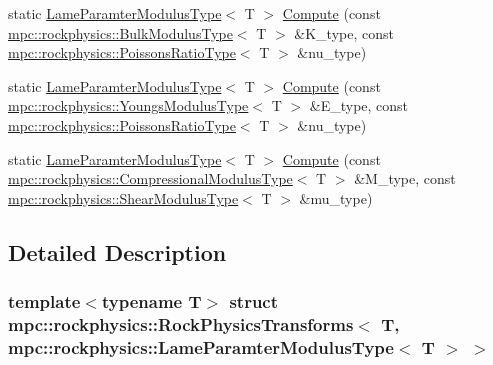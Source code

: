 \begin{DoxyCompactItemize}
\item 
static \mbox{\hyperlink{structmpc_1_1rockphysics_1_1_lame_paramter_modulus_type}{Lame\+Paramter\+Modulus\+Type}}$<$ T $>$ \mbox{\hyperlink{structmpc_1_1rockphysics_1_1_rock_physics_transforms_3_01_t_00_01mpc_1_1rockphysics_1_1_lame_para5e1496021e3962f82419b3f52eb8942_a8a33b7636abc317e5ff1d91dcbed6797}{Compute}} (const \mbox{\hyperlink{structmpc_1_1rockphysics_1_1_bulk_modulus_type}{mpc\+::rockphysics\+::\+Bulk\+Modulus\+Type}}$<$ T $>$ \&K\+\_\+type, const \mbox{\hyperlink{structmpc_1_1rockphysics_1_1_poissons_ratio_type}{mpc\+::rockphysics\+::\+Poissons\+Ratio\+Type}}$<$ T $>$ \&nu\+\_\+type)
\item 
static \mbox{\hyperlink{structmpc_1_1rockphysics_1_1_lame_paramter_modulus_type}{Lame\+Paramter\+Modulus\+Type}}$<$ T $>$ \mbox{\hyperlink{structmpc_1_1rockphysics_1_1_rock_physics_transforms_3_01_t_00_01mpc_1_1rockphysics_1_1_lame_para5e1496021e3962f82419b3f52eb8942_aff263f00bac2fc503336ebb19f160db4}{Compute}} (const \mbox{\hyperlink{structmpc_1_1rockphysics_1_1_youngs_modulus_type}{mpc\+::rockphysics\+::\+Youngs\+Modulus\+Type}}$<$ T $>$ \&E\+\_\+type, const \mbox{\hyperlink{structmpc_1_1rockphysics_1_1_poissons_ratio_type}{mpc\+::rockphysics\+::\+Poissons\+Ratio\+Type}}$<$ T $>$ \&nu\+\_\+type)
\item 
static \mbox{\hyperlink{structmpc_1_1rockphysics_1_1_lame_paramter_modulus_type}{Lame\+Paramter\+Modulus\+Type}}$<$ T $>$ \mbox{\hyperlink{structmpc_1_1rockphysics_1_1_rock_physics_transforms_3_01_t_00_01mpc_1_1rockphysics_1_1_lame_para5e1496021e3962f82419b3f52eb8942_afefb8b5bba91818370a629a0ff035c35}{Compute}} (const \mbox{\hyperlink{structmpc_1_1rockphysics_1_1_compressional_modulus_type}{mpc\+::rockphysics\+::\+Compressional\+Modulus\+Type}}$<$ T $>$ \&M\+\_\+type, const \mbox{\hyperlink{structmpc_1_1rockphysics_1_1_shear_modulus_type}{mpc\+::rockphysics\+::\+Shear\+Modulus\+Type}}$<$ T $>$ \&mu\+\_\+type)
\end{DoxyCompactItemize}


\subsection{Detailed Description}
\subsubsection*{template$<$typename T$>$\newline
struct mpc\+::rockphysics\+::\+Rock\+Physics\+Transforms$<$ T, mpc\+::rockphysics\+::\+Lame\+Paramter\+Modulus\+Type$<$ T $>$ $>$}



